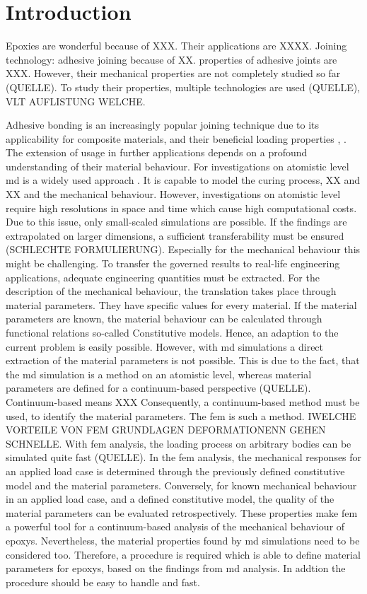 \chapter{Introduction}

Epoxies are wonderful because of XXX. Their applications are XXXX. Joining technology: adhesive joining because of XX. properties of adhesive joints are XXX. However, their mechanical properties are not completely studied so far (QUELLE). To study their properties, multiple technologies are used (QUELLE), VLT AUFLISTUNG WELCHE. 

Adhesive bonding is an increasingly popular joining technique due to its applicability for composite materials, and their beneficial loading properties \cite{campilho_extended_2011}, \cite{pramanik_joining_2017}. The extension of usage in further applications depends on a profound understanding of their material behaviour. For investigations on atomistic level \acrfull{md} is a widely used approach  \cite{ries_mechanical_2024}. It is capable to model the curing process, XX and XX and the mechanical behaviour. However, investigations on atomistic level require high resolutions in space and time which cause high computational costs. Due to this issue, only small-scaled simulations are possible. If the findings are extrapolated on larger dimensions, a sufficient transferability must be ensured (SCHLECHTE FORMULIERUNG). Especially for the mechanical behaviour this might be challenging. To transfer the governed results to real-life engineering applications, adequate engineering quantities must be extracted. For the description of the mechanical behaviour, the translation takes place through material parameters. They have specific values for every material. If the material parameters are known, the material behaviour can be calculated through functional relations so-called Constitutive models. Hence, an adaption to the current problem is easily possible. However, with \acrshort{md} simulations a direct extraction of the material parameters is not possible. This is due to the fact, that the \acrshort{md} simulation is a method on an atomistic level, whereas material parameters are defined for a continuum-based perspective (QUELLE). Continuum-based means XXX Consequently, a continuum-based method must be used, to identify the material parameters. The \acrfull{fem} is such a method. IWELCHE VORTEILE VON FEM GRUNDLAGEN DEFORMATIONENN GEHEN SCHNELLE. With \acrshort{fem} analysis, the loading process on arbitrary bodies can be simulated quite fast (QUELLE). In the \acrshort{fem} analysis, the mechanical responses for an applied load case is determined through the previously defined constitutive model and the material parameters. Conversely, for known mechanical behaviour in an applied load case, and a defined constitutive model, the quality of the material parameters can be evaluated retrospectively. 
These properties make \acrshort{fem} a powerful tool for a continuum-based analysis of the mechanical behaviour of epoxys. Nevertheless, the material properties found by \acrshort{md} simulations need to be considered too. Therefore, a procedure is required which is able to define material parameters for epoxys, based on the findings from \acrshort{md} analysis. In addtion the procedure should be easy to handle and fast.
